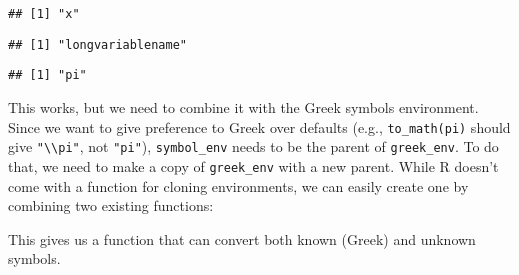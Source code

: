 \begin{verbatim}
## [1] "x"
\end{verbatim}

\begin{Shaded}
\begin{Highlighting}[]
\end{Highlighting}
\end{Shaded}

\begin{verbatim}
## [1] "longvariablename"
\end{verbatim}

\begin{Shaded}
\begin{Highlighting}[]
\end{Highlighting}
\end{Shaded}

\begin{verbatim}
## [1] "pi"
\end{verbatim}

This works, but we need to combine it with the Greek symbols
environment. Since we want to give preference to Greek over defaults
(e.g., \texttt{to\_math(pi)} should give
\texttt{"\textbackslash{}\textbackslash{}pi"}, not \texttt{"pi"}),
\texttt{symbol\_env} needs to be the parent of \texttt{greek\_env}. To
do that, we need to make a copy of \texttt{greek\_env} with a new
parent. While R doesn't come with a function for cloning environments,
we can easily create one by combining two existing functions:

\begin{Shaded}
\begin{Highlighting}[]
\StringTok{ } 
  \NormalTok{(}
\NormalTok{\}}
\end{Highlighting}
\end{Shaded}

This gives us a function that can convert both known (Greek) and unknown
symbols.

\begin{Shaded}
\begin{Highlighting}[]
\StringTok{ }
\StringTok{ }
\StringTok{ }\NormalTok{(}
\StringTok{ }

\NormalTok{\}}

\end{Highlighting}
\end{Shaded}

